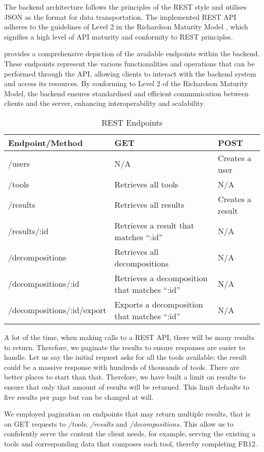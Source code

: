 The backend architecture follows the principles of the REST style and utilises
JSON as the format for data transportation. The implemented REST API adheres to
the guidelines of Level 2 in the Richardson Maturity Model
\cite{fowler-richardson-maturity-model}, which signifies a high level of API
maturity and conformity to REST principles.

 provides a comprehensive depiction of the available
endpoints within the backend. These endpoints represent the various
functionalities and operations that can be performed through the API, allowing
clients to interact with the backend system and access its resources. By
conforming to Level 2 of the Richardson Maturity Model, the backend ensures
standardised and efficient communication between clients and the server,
enhancing interoperability and scalability.

\begin{table}[!htb] \caption{REST Endpoints} \label{tab:rest_endpoints}
  \begin{center}
    \begin{tabular}[c]{p{12em}|p{12em}|p{12em}}
      \textbf{Endpoint/Method} &
      \textbf{GET} &
      \textbf{POST} \\
      \hline {/users} & N/A & Creates a user \\
      \hline {/tools} & Retrieves all tools & N/A \\
      \hline {/results} & Retrieves all results & Creates a result \\
      \hline {/results/:id} & Retrieves a result that matches ``:id'' & N/A \\
      \hline {/decompositions} & Retrieves all decompositions & N/A \\
      \hline {/decompositions/:id} & Retrieves a decomposition that matches ``:id'' & N/A \\
      \hline {/decompositions/:id/export} & Exports a decomposition that matches ``:id'' & N/A \\
    \end{tabular}
  \end{center}
\end{table}

A lot of the time, when making calls to a REST API, there will be many results
to return. Therefore, we paginate the results to ensure responses are easier to
handle. Let us say the initial request asks for all the tools available; the
result could be a massive response with hundreds of thousands of tools. There
are better places to start than that. Therefore, we have built a limit on
results to ensure that only that amount of results will be returned. This limit
defaults to five results per page but can be changed at will.

We employed pagination on endpoints that may return multiple results, that is
on GET requests to \textit{/tools}, \textit{/results} and
\textit{/decompositions}. This allow us to confidently serve the content the
client needs, for example, serving the existing a tools and corresponding data
that composes each tool, thereby completing FR12.
